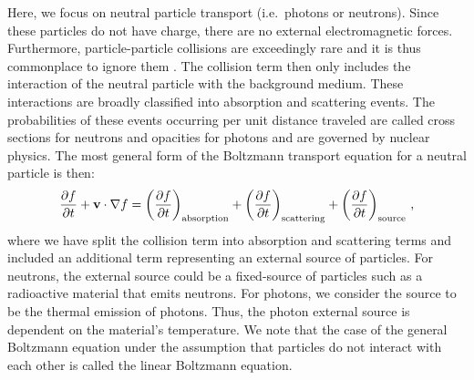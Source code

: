 \documentclass[../doc.tex]{subfiles}
\begin{document}
Here, we focus on neutral particle transport (i.e.~photons or neutrons). Since these particles do not have charge, there are no external electromagnetic forces. Furthermore, particle-particle collisions are exceedingly rare and it is thus commonplace to ignore them \cite{neutron_transport_LM}. The collision term then only includes the interaction of the neutral particle with the background medium. These interactions are broadly classified into absorption and scattering events. The probabilities of these events occurring per unit distance traveled are called cross sections for neutrons and opacities for photons and are governed by nuclear physics. The most general form of the Boltzmann transport equation for a neutral particle is then: 
	\begin{equation} \label{trans:linboltz}
		\frac{\partial f}{\partial t} + \boldsymbol{\mathrm{v}} \cdot \nabla f = \left( \frac{\partial f}{\partial t} \right)_\text{absorption} + \left( \frac{\partial f}{\partial t} \right)_\text{scattering} + \left( \frac{\partial f}{\partial t} \right)_\text{source} \,,
	\end{equation}
where we have split the collision term into absorption and scattering terms and included an additional term representing an external source of particles. For neutrons, the external source could be a fixed-source of particles such as a radioactive material that emits neutrons. For photons, we consider the source to be the thermal emission of photons. Thus, the photon external source is dependent on the material's temperature. We note that the case of the general Boltzmann equation under the assumption that particles do not interact with each other is called the linear Boltzmann equation. 
\end{document}
